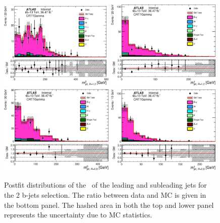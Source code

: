 \begin{figure}[htbp]
\begin{center}
\includegraphics[width=0.49\textwidth]{figures/ttGamma/postfit/AntiKt12M_0__CRTTGamma.eps}
\includegraphics[width=0.49\textwidth]{figures/ttGamma/postfit/AntiKt12M_1__CRTTGamma.eps}
\includegraphics[width=0.49\textwidth]{figures/ttGamma/postfit/AntiKt8M_0__CRTTGamma.eps}
\includegraphics[width=0.49\textwidth]{figures/ttGamma/postfit/AntiKt8M_1__CRTTGamma.eps}
\caption{\label{fig:ttVMasses} Postfit distributions of the \pT\ of the
  leading and subleading jets for the 2 b-jets selection. The ratio between data and MC is given in the bottom panel. The hashed area in both the top and lower panel represents the uncertainty due to MC statistics.}
\end{center}
\end{figure}



